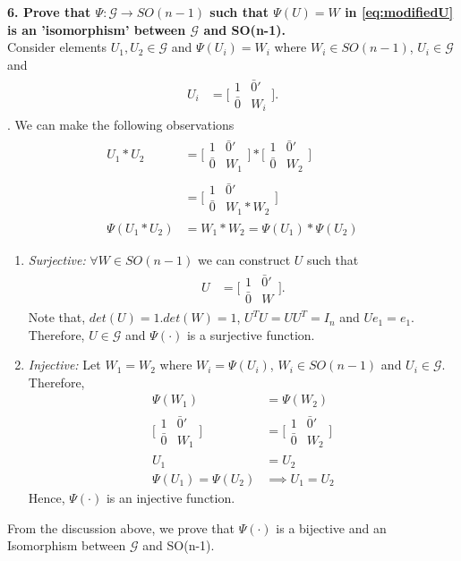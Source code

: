 \documentclass[11pt]{article}
\begin{document}
\textbf{6. Prove that $\Psi: \mathcal{G} \rightarrow SO(n-1)$ such that $\Psi(U) = W$ in \eqref{eq:modifiedU} is an 'isomorphism' between $\mathcal{G}$ and SO(n-1).}\\
Consider elements $U_1, U_2 \in \mathcal{G}$ and $\Psi(U_i) = W_i$ where $W_i \in SO(n-1)$, $U_i \in \mathcal{G}$ and
\begin{align}
U_i &= \bigg[\begin{array}{cc}
1 & \bar{0}'\\
\bar{0} & W_i
\end{array}\bigg]. 
\end{align}.
We can make the following observations
\begin{align*}
U_1*U_2 &= \bigg[\begin{array}{cc}
1 & \bar{0}'\\
\bar{0} & W_1
\end{array}\bigg]*
\bigg[\begin{array}{cc}
1 & \bar{0}'\\
\bar{0} & W_2
\end{array}\bigg]\\  
&= \bigg[\begin{array}{cc}
1 & \bar{0}'\\
\bar{0} & W_1*W_2
\end{array}\bigg]\\
\Psi(U_1*U_2) &= W_1*W_2 = \Psi(U_1)*\Psi(U_2)
\end{align*}

\begin{enumerate}
\item \emph{Surjective:} $\forall W \in SO(n-1)$ we can construct $U$ such that
\begin{align}
U &= \bigg[\begin{array}{cc}
1 & \bar{0}'\\
\bar{0} & W
\end{array}\bigg]. 
\end{align}
Note that, $det(U) = 1.det(W) = 1$, $U^TU = UU^T = I_n$ and $Ue_1 = e_1$. Therefore, $U \in \mathcal{G}$ and 
$\Psi(\cdot)$ is a surjective function.
\item \emph{Injective:} Let $W_1 = W_2$ where $W_i = \Psi(U_i)$, $W_i \in SO(n-1)$ and $U_i \in \mathcal{G}$. Therefore,
\begin{align*}
\Psi(W_1) &= \Psi(W_2)\\
\bigg[\begin{array}{cc}
1 & \bar{0}'\\
\bar{0} & W_1
\end{array}\bigg] &= \bigg[\begin{array}{cc}
1 & \bar{0}'\\
\bar{0} & W_2
\end{array}\bigg]\\
U_1 &= U_2\\
\Psi(U_1) = \Psi(U_2) &\implies U_1 = U_2
\end{align*}
Hence, $\Psi(\cdot)$ is an injective function.
\end{enumerate}
From the discussion above, we prove that $\Psi(\cdot)$ is a bijective and an Isomorphism between $\mathcal{G}$ and SO(n-1).
\end{document}
